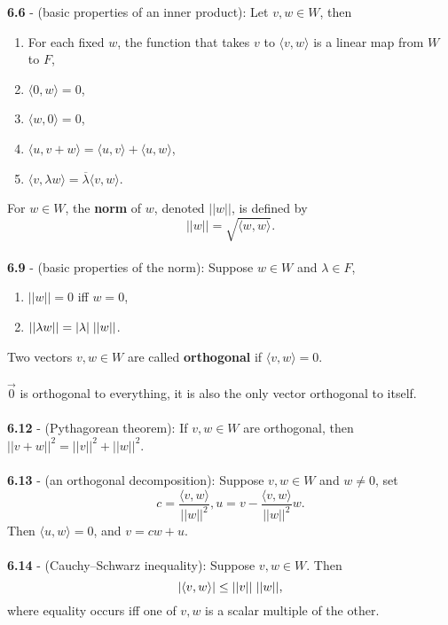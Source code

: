 \documentclass{article}
\theoremstyle{definition}
\begin{document}
\textbf{6.6} - (basic properties of an inner product): Let $v, w \in W$, then \begin{enumerate}
    \item For each fixed $w$, the function that takes $v$ to $\langle v, w \rangle$ is a linear map from $W$ to $F$,
    \item $\langle 0, w \rangle = 0$,
    \item $\langle w, 0 \rangle = 0$,
    \item $\langle u, v + w \rangle = \langle u, v \rangle + \langle u, w \rangle$,
    \item $\langle v, \lambda w \rangle = \overline{\lambda}\langle v, w \rangle$.
\end{enumerate} $ $ \\
For $w \in W$, the \textbf{norm} of $w$, denoted $||w||$, is defined by $$||w|| = \sqrt{\langle w, w \rangle}.$$ \\
\textbf{6.9} - (basic properties of the norm): Suppose $w \in W$ and $\lambda \in F$, \begin{enumerate}
    \item $||w|| = 0$ iff $w = 0$,
    \item $||\lambda w|| = |\lambda| \hspace{1mm} ||w||$.
\end{enumerate} $ $ \\
Two vectors $v, w \in W$ are called \textbf{orthogonal} if $\langle v, w \rangle = 0$. \\ \\
$\vec{0}$ is orthogonal to everything, it is also the only vector orthogonal to itself. \\ \\
\textbf{6.12} - (Pythagorean theorem): If $v, w \in W$ are orthogonal, then $||v + w||^2 = ||v||^2 + ||w||^2$. \\ \\
\textbf{6.13} - (an orthogonal decomposition): Suppose $v, w \in W$ and $w \neq 0$, set $$c = \frac{\langle v, w \rangle}{||w||^2}, u = v - \frac{\langle v, w \rangle}{||w||^2}w.$$ Then $\langle u, w \rangle = 0$, and $v = cw + u$. \\ \\
\textbf{6.14} - (Cauchy–Schwarz inequality): Suppose $v, w \in W$. Then $$|\langle v, w\rangle| \leq ||v|| \hspace{1mm} ||w||,$$ where equality occurs iff one of $v, w$ is a scalar multiple of the other. \\ \\
\end{document}
